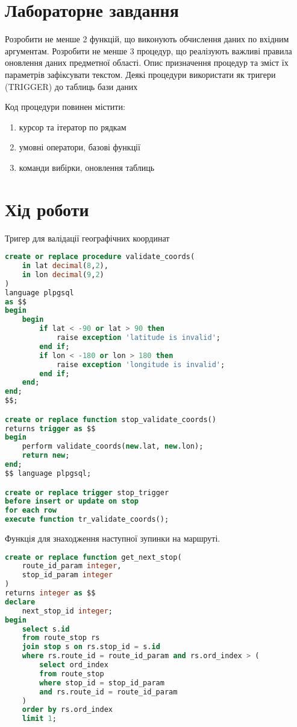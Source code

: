 \documentclass[14pt]{extreport}
\begin{document}
\begin{normalsize}
	\section*{Лабораторне завдання}
	Розробити не менше 2 функцій, що виконують обчислення даних по вхідним аргументам. Розробити не менше 3 процедур, що реалізують важливі правила оновлення даних предметної області. Опис призначення процедур та зміст їх параметрів зафіксувати текстом. Деякі процедури використати як тригери (TRIGGER) до таблиць бази даних
	
	Код процедури повинен містити:
	\begin{enumerate}
		\item курсор та ітератор по рядкам
		\item умовні оператори, базові функції 
		\item команди вибірки, оновлення таблиць
	\end{enumerate}
	
	\section*{Хід роботи}
	
	Тригер для валідації географічних координат
	
	\begin{small}
		\begin{lstlisting}[language=sql]
create or replace procedure validate_coords(
	in lat decimal(8,2),
	in lon decimal(9,2)
)
language plpgsql
as $$
begin
	begin
		if lat < -90 or lat > 90 then
			raise exception 'latitude is invalid';
		end if;
		if lon < -180 or lon > 180 then
			raise exception 'longitude is invalid';
		end if;
	end;
end;
$$;

create or replace function stop_validate_coords()
returns trigger as $$
begin
	perform validate_coords(new.lat, new.lon);
	return new;
end;
$$ language plpgsql;

create or replace trigger stop_trigger
before insert or update on stop
for each row
execute function tr_validate_coords();
		\end{lstlisting}
	\end{small}
	
	Функція для знаходження наступної зупинки на маршруті.
	
	\begin{small}
		\begin{lstlisting}[language=sql]
create or replace function get_next_stop(
	route_id_param integer,
	stop_id_param integer
)
returns integer as $$
declare
	next_stop_id integer;
begin
	select s.id
	from route_stop rs
	join stop s on rs.stop_id = s.id
	where rs.route_id = route_id_param and rs.ord_index > (
		select ord_index 
		from route_stop 
		where stop_id = stop_id_param 
		and rs.route_id = route_id_param
	)
	order by rs.ord_index
	limit 1;
	

\end{lstlisting}
\end{small}
\end{normalsize}
\end{document}
